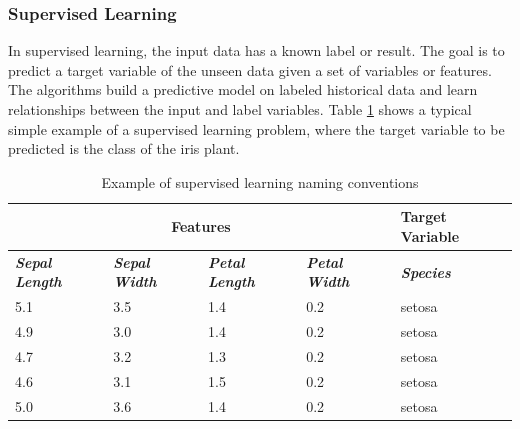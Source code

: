 \subsubsection{Supervised Learning}

In supervised learning, the input data has a known label or result. The goal is to predict a target variable of the unseen data given a set of variables or features. The algorithms build a predictive model on labeled historical data and learn relationships between the input and label variables. Table \ref{tab:supervised_learning} shows a typical simple example of a supervised learning problem, where the target variable to be predicted is the class of the iris plant.

\begin{table}[H]
\begin{tabular*}{\textwidth}{p{} p{} p{} p{} p{}}
\hline
\multicolumn{4}{c}{\textbf{Features}}                                                                                                               & \textbf{Target Variable}  \\ \hline
\textit{\textbf{Sepal Length}} & \textit{\textbf{Sepal Width}} & \textit{\textbf{Petal Length}} & \textit{\textbf{Petal Width}} & \textit{\textbf{Species}} \\ \hline
5.1                                 & 3.5                                & 1.4                                 & 0.2                                & setosa                    \\
4.9                                 & 3.0                                & 1.4                                 & 0.2                                & setosa                    \\
4.7                                 & 3.2                                & 1.3                                 & 0.2                                & setosa                    \\
4.6                                 & 3.1                                & 1.5                                 & 0.2                                & setosa                    \\
5.0                                 & 3.6                                & 1.4                                 & 0.2                                & setosa                    \\ \hline
\end{tabular*}
\caption{Example of supervised learning naming conventions}
\label{tab:supervised_learning}
\end{table}

